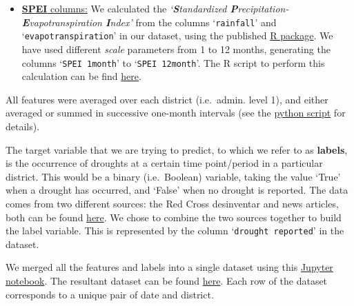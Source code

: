 \documentclass[10pt,parskip=half,
toc=sectionentrywithdots,
bibliography=totocnumbered,
captions=tableheading,numbers=noendperiod]{scrartcl}
\begin{document}
\begin{itemize}
\item
  \href{https://spei.csic.es/}{\textbf{SPEI} columns:} We calculated the
  \emph{`\textbf{\emph{S}}tandardized
  \textbf{\emph{P}}recipitation-\textbf{\emph{E}}vapotranspiration
  \textbf{\emph{I}}ndex'} from the columns `\texttt{rainfall}' and
  `\texttt{evapotranspiration}' in our dataset, using the published
  \href{https://spei.csic.es/tools.html}{R package}. We have used
  different \emph{scale} parameters from 1 to 12 months, generating the
  columns `\texttt{SPEI\ 1month}' to `\texttt{SPEI\ 12month}'. The R
  script to perform this calculation can be find
  \href{https://github.com/rodekruis/Drought_IBF/blob/master/Model\%20Event\%20Data/SPEI_satellite/calc_SPEI.R}{here}.
\end{itemize}

All features were averaged over each district (i.e.~admin. level 1), and
either averaged or summed in successive one-month intervals (see the
\href{https://github.com/rodekruis/Drought_IBF/blob/master/GoogleEarthEngine/GEE_get_data.py}{python
script} for details).

The target variable that we are trying to predict, to which we refer to
as \textbf{labels}, is the occurrence of droughts at a certain time
point/period in a particular district. This would be a binary
(i.e.~Boolean) variable, taking the value `True' when a drought has
occurred, and `False' when no drought is reported. The data comes from
two different sources: the Red Cross desinventar and news articles, both
can be found
\href{https://rodekruis.sharepoint.com/sites/510-CRAVK-510/Gedeelde\%20\%20documenten/Forms/AllItems.aspx?RootFolder=\%2Fsites\%2F510\%2DCRAVK\%2D510\%2FGedeelde\%20\%20documenten\%2F\%5BCTRY\%5D\%20Uganda\%2F2\%2D\%20IBF\%20DROUGHT\%20UGANDA\%2FDROUGHT\%20EVENTS\%20\%26\%20IMPACT\%20ANALYSIS\&FolderCTID=0x012000D122CA8FA5B68345A13A32EDAA653915}{here}.
We chose to combine the two sources together to build the label
variable. This is represented by the column `\texttt{drought\ reported}'
in the dataset.

We merged all the features and labels into a single dataset using this
\href{https://github.com/rodekruis/Drought_IBF/blob/master/Model\%20Event\%20Data/combining\%20satellite\%20data\%20with\%20desinventar\%20events\%20and\%20news\%20article\%20events\%20.ipynb}{Jupyter
notebook}. The resultant dataset can be found
\href{https://github.com/rodekruis/Drought_IBF/blob/master/Model\%20Event\%20Data/datasets/Droughts_satelite_and_events.csv}{here}.
Each row of the dataset corresponds to a unique pair of date and
district.
\end{document}
